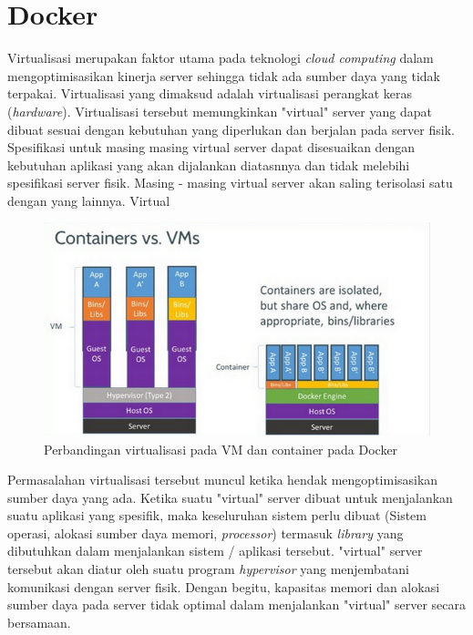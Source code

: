 \section{Docker}
Virtualisasi merupakan faktor utama pada teknologi \textit{cloud computing} dalam mengoptimisasikan kinerja server sehingga tidak ada sumber daya yang tidak terpakai. Virtualisasi yang dimaksud adalah virtualisasi perangkat keras (\textit{hardware}). Virtualisasi tersebut  memungkinkan "virtual" server yang dapat dibuat sesuai dengan kebutuhan yang diperlukan dan berjalan pada server fisik. Spesifikasi untuk masing masing virtual server dapat disesuaikan dengan kebutuhan aplikasi yang akan dijalankan diatasnnya dan tidak melebihi spesifikasi server fisik. Masing - masing virtual server akan saling terisolasi satu dengan yang lainnya. Virtual 

\begin{figure}
	\centering
	\includegraphics[scale=0.6]{vm.png}
	\caption{Perbandingan virtualisasi pada VM dan container pada Docker}
\end{figure}

Permasalahan virtualisasi tersebut muncul ketika hendak mengoptimisasikan sumber daya yang ada. Ketika suatu "virtual" server dibuat untuk menjalankan suatu aplikasi yang spesifik, maka keseluruhan sistem perlu dibuat (Sistem operasi, alokasi sumber daya memori, \textit{processor}) termasuk \textit{library} yang dibutuhkan dalam menjalankan sistem / aplikasi tersebut. "virtual" server tersebut akan diatur oleh suatu program \textit{hypervisor} yang menjembatani komunikasi dengan server fisik. Dengan begitu, kapasitas memori dan alokasi sumber daya pada server tidak optimal dalam menjalankan "virtual" server secara bersamaan. 

